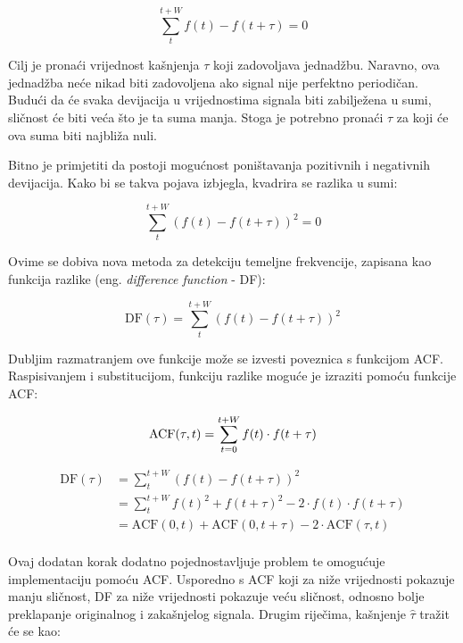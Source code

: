 \documentclass[times, utf8, diplomski, numeric]{fer}
\begin{document}
\begin{equation}
	\sum_{t}^{t + W} {f(t) - f(t + \tau)} = 0
\end{equation}

Cilj je pronaći vrijednost kašnjenja $\tau$ koji zadovoljava jednadžbu. Naravno, ova jednadžba neće nikad biti zadovoljena ako signal nije perfektno periodičan. Budući da će svaka devijacija u vrijednostima signala biti zabilježena u sumi, sličnost će biti veća što je ta suma manja. Stoga je potrebno pronaći $\tau$ za koji će ova suma biti najbliža nuli.

Bitno je primjetiti da postoji mogućnost poništavanja pozitivnih i negativnih devijacija. Kako bi se takva pojava izbjegla, kvadrira se razlika u sumi:

\begin{equation}
	\sum_{t}^{t + W} {(f(t) - f(t + \tau))^2} = 0
\end{equation}

Ovime se dobiva nova metoda za detekciju temeljne frekvencije, zapisana kao funkcija razlike (eng. \textit{difference function} - DF):

\begin{equation}
	\mathrm{DF}(\tau) = \sum_{t}^{t + W} {(f(t) - f(t + \tau))^2}
\end{equation}

Dubljim razmatranjem ove funkcije može se izvesti poveznica s funkcijom ACF. Raspisivanjem i substitucijom, funkciju razlike moguće je izraziti pomoću funkcije ACF:

\begin{equation}
	\mathrm{ACF}(\tau, t) = \sum_{t = 0}^{t + W} {f(t) \cdot f(t + \tau)} \\
\end{equation}

\begin{equation}
	\begin{split}
		\mathrm{DF}(\tau) &= \sum_{t}^{t + W} {(f(t) - f(t + \tau))^2} \\
		&= \sum_{t}^{t + W} {f(t)^2 + f(t + \tau)^2 - 2 \cdot f(t) \cdot f(t + \tau)} \\
		&= \mathrm{ACF}(0, t) + \mathrm{ACF}(0, t + \tau) - 2 \cdot \mathrm{ACF}(\tau, t) \\
	\end{split}
\end{equation}

Ovaj dodatan korak dodatno pojednostavljuje problem te omogućuje implementaciju pomoću ACF. Usporedno s ACF koji za niže vrijednosti pokazuje manju sličnost, DF za niže vrijednosti pokazuje veću sličnost, odnosno bolje preklapanje originalnog i zakašnjelog signala. Drugim riječima, kašnjenje $\hat{\tau}$ tražit će se kao:
\end{document}
